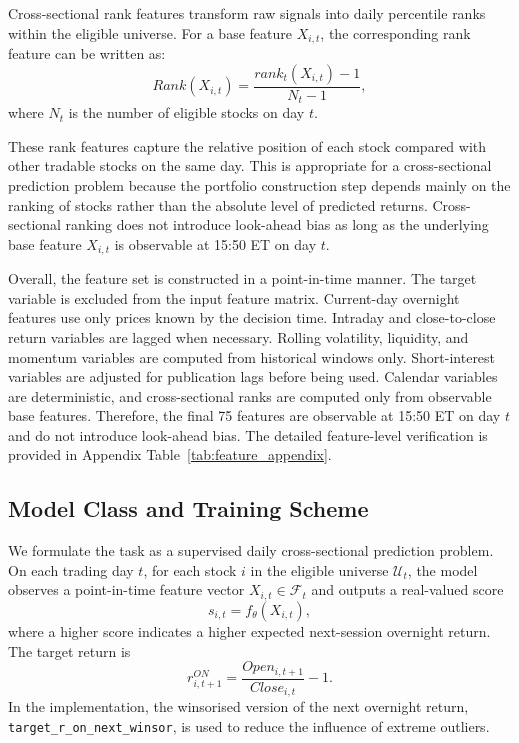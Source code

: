 \documentclass[12pt]{article}
\begin{document}
Cross-sectional rank features transform raw signals into daily percentile ranks within the eligible universe. For a base feature $X_{i,t}$, the corresponding rank feature can be written as:
\begin{equation}
    Rank(X_{i,t}) = \frac{rank_t(X_{i,t}) - 1}{N_t - 1},
\end{equation}
where $N_t$ is the number of eligible stocks on day $t$.

These rank features capture the relative position of each stock compared with other tradable stocks on the same day. This is appropriate for a cross-sectional prediction problem because the portfolio construction step depends mainly on the ranking of stocks rather than the absolute level of predicted returns. Cross-sectional ranking does not introduce look-ahead bias as long as the underlying base feature $X_{i,t}$ is observable at 15:50 ET on day $t$.

Overall, the feature set is constructed in a point-in-time manner. The target variable is excluded from the input feature matrix. Current-day overnight features use only prices known by the decision time. Intraday and close-to-close return variables are lagged when necessary. Rolling volatility, liquidity, and momentum variables are computed from historical windows only. Short-interest variables are adjusted for publication lags before being used. Calendar variables are deterministic, and cross-sectional ranks are computed only from observable base features. Therefore, the final 75 features are observable at 15:50 ET on day $t$ and do not introduce look-ahead bias. The detailed feature-level verification is provided in Appendix Table~\ref{tab:feature_appendix}.
\subsection{Model Class and Training Scheme}

We formulate the task as a supervised daily cross-sectional prediction problem. On each trading day $t$, for each stock $i$ in the eligible universe $\mathcal{U}_t$, the model observes a point-in-time feature vector $X_{i,t}\in\mathcal{F}_t$ and outputs a real-valued score
\[
s_{i,t}=f_{\theta}(X_{i,t}),
\]
where a higher score indicates a higher expected next-session overnight return. The target return is
\[
r^{ON}_{i,t+1}=\frac{Open_{i,t+1}}{Close_{i,t}}-1.
\]
In the implementation, the winsorised version of the next overnight return, \texttt{target\_r\_on\_next\_winsor}, is used to reduce the influence of extreme outliers.
\end{document}
